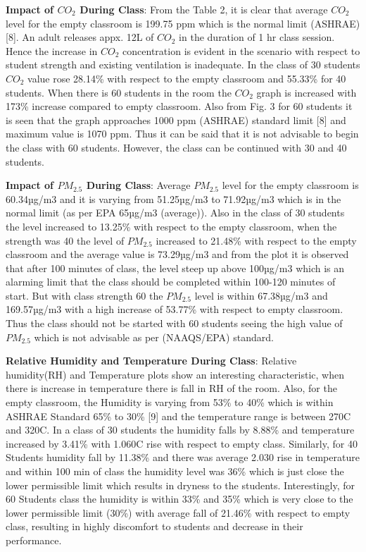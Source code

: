 \textbf{Impact of $CO_2$ During Class}: From the Table 2, it is clear that average $CO_2$ level for the empty classroom is 199.75 ppm which is the normal limit (ASHRAE) [8]. An adult releases appx. 12L of $CO_2$ in the duration of 1 hr class session. Hence the increase in $CO_2$ concentration is evident in the scenario with respect to student strength and existing ventilation is inadequate. In the class of 30 students $CO_2$ value rose 28.14\% with respect to the empty classroom and 55.33\% for 40 students. When there is 60 students in the room the $CO_2$ graph is increased with 173\% increase compared to empty classroom. Also from Fig. 3 for 60 students it is seen that the graph approaches 1000 ppm (ASHRAE) standard limit [8] and maximum value is 1070 ppm. Thus it can be said that it is not advisable to begin the class with 60 students. However, the class can be continued with 30 and 40 students.

\textbf{Impact of $PM_{2.5}$ During Class}: Average $PM_{2.5}$ level for the empty classroom is 60.34µg/m3 and it is varying from 51.25µg/m3 to 71.92µg/m3 which is in the normal limit (as per EPA 65µg/m3 (average)). Also in the class of 30 students the level increased to 13.25\% with respect to the empty classroom, when the strength was 40 the level of $PM_{2.5}$ increased to 21.48\% with respect to the empty classroom and the average value is 73.29µg/m3 and from the plot it is observed that after 100 minutes of class, the level steep up above 100µg/m3 which is an alarming limit that the class should be completed within 100-120 minutes of start. But with class strength 60 the $PM_{2.5}$ level is within 67.38µg/m3 and 169.57µg/m3 with a high increase of 53.77\% with respect to empty classroom. Thus the class should not be started with 60 students seeing the high value of $PM_{2.5}$ which is not advisable as per (NAAQS/EPA) standard.


\textbf{Relative Humidity and Temperature During Class}: Relative humidity(RH) and Temperature plots show an interesting characteristic, when there is increase in temperature there is fall in RH of the room. Also, for the empty classroom, the Humidity is varying from 53\% to 40\% which is within ASHRAE Standard 65\% to 30\% [9] and the temperature range is between 270C and 320C. In a class of 30 students the humidity falls by 8.88\% and temperature increased by 3.41\% with 1.060C rise with respect to empty class. Similarly, for 40 Students humidity fall by 11.38\% and there was average 2.030 rise in temperature and within 100 min of class the humidity level was 36\% which is just close the lower permissible limit which results in dryness to the students. Interestingly, for 60 Students class the humidity is within 33\% and 35\% which is very close to the lower permissible limit (30\%) with average fall of 21.46\% with respect to empty class, resulting in highly discomfort to students and decrease in their performance.




